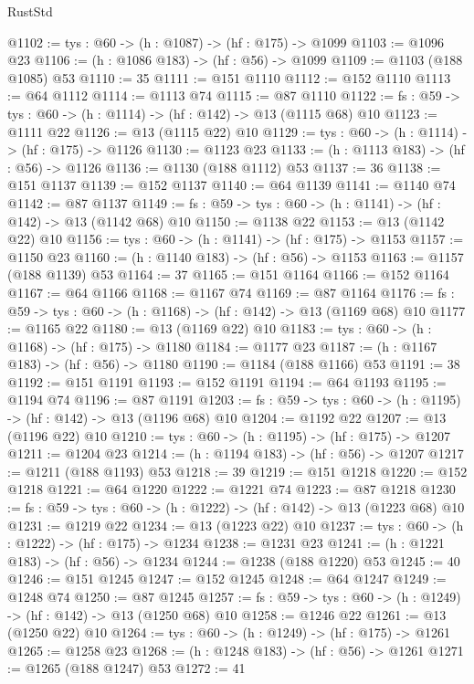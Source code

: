 \begin{lexlean}{RustStd}
\begin{coremodule}
@1102 := {tys : @60} -> (h : @1087) -> (hf : @175) -> @1099
@1103 := @1096 @23
@1106 := (h : @1086 @183) -> (hf : @56) -> @1099
@1109 := @1103 (@188 @1085) @53
@1110 := 35
@1111 := @151 @1110
@1112 := @152 @1110
@1113 := @64 @1112
@1114 := @1113 @74
@1115 := @87 @1110
@1122 := {fs : @59} -> {tys : @60} -> (h : @1114) -> (hf : @142) -> @13 (@1115 @68) @10
@1123 := @1111 @22
@1126 := @13 (@1115 @22) @10
@1129 := {tys : @60} -> (h : @1114) -> (hf : @175) -> @1126
@1130 := @1123 @23
@1133 := (h : @1113 @183) -> (hf : @56) -> @1126
@1136 := @1130 (@188 @1112) @53
@1137 := 36
@1138 := @151 @1137
@1139 := @152 @1137
@1140 := @64 @1139
@1141 := @1140 @74
@1142 := @87 @1137
@1149 := {fs : @59} -> {tys : @60} -> (h : @1141) -> (hf : @142) -> @13 (@1142 @68) @10
@1150 := @1138 @22
@1153 := @13 (@1142 @22) @10
@1156 := {tys : @60} -> (h : @1141) -> (hf : @175) -> @1153
@1157 := @1150 @23
@1160 := (h : @1140 @183) -> (hf : @56) -> @1153
@1163 := @1157 (@188 @1139) @53
@1164 := 37
@1165 := @151 @1164
@1166 := @152 @1164
@1167 := @64 @1166
@1168 := @1167 @74
@1169 := @87 @1164
@1176 := {fs : @59} -> {tys : @60} -> (h : @1168) -> (hf : @142) -> @13 (@1169 @68) @10
@1177 := @1165 @22
@1180 := @13 (@1169 @22) @10
@1183 := {tys : @60} -> (h : @1168) -> (hf : @175) -> @1180
@1184 := @1177 @23
@1187 := (h : @1167 @183) -> (hf : @56) -> @1180
@1190 := @1184 (@188 @1166) @53
@1191 := 38
@1192 := @151 @1191
@1193 := @152 @1191
@1194 := @64 @1193
@1195 := @1194 @74
@1196 := @87 @1191
@1203 := {fs : @59} -> {tys : @60} -> (h : @1195) -> (hf : @142) -> @13 (@1196 @68) @10
@1204 := @1192 @22
@1207 := @13 (@1196 @22) @10
@1210 := {tys : @60} -> (h : @1195) -> (hf : @175) -> @1207
@1211 := @1204 @23
@1214 := (h : @1194 @183) -> (hf : @56) -> @1207
@1217 := @1211 (@188 @1193) @53
@1218 := 39
@1219 := @151 @1218
@1220 := @152 @1218
@1221 := @64 @1220
@1222 := @1221 @74
@1223 := @87 @1218
@1230 := {fs : @59} -> {tys : @60} -> (h : @1222) -> (hf : @142) -> @13 (@1223 @68) @10
@1231 := @1219 @22
@1234 := @13 (@1223 @22) @10
@1237 := {tys : @60} -> (h : @1222) -> (hf : @175) -> @1234
@1238 := @1231 @23
@1241 := (h : @1221 @183) -> (hf : @56) -> @1234
@1244 := @1238 (@188 @1220) @53
@1245 := 40
@1246 := @151 @1245
@1247 := @152 @1245
@1248 := @64 @1247
@1249 := @1248 @74
@1250 := @87 @1245
@1257 := {fs : @59} -> {tys : @60} -> (h : @1249) -> (hf : @142) -> @13 (@1250 @68) @10
@1258 := @1246 @22
@1261 := @13 (@1250 @22) @10
@1264 := {tys : @60} -> (h : @1249) -> (hf : @175) -> @1261
@1265 := @1258 @23
@1268 := (h : @1248 @183) -> (hf : @56) -> @1261
@1271 := @1265 (@188 @1247) @53
@1272 := 41

\end{coremodule}
\end{lexlean}
